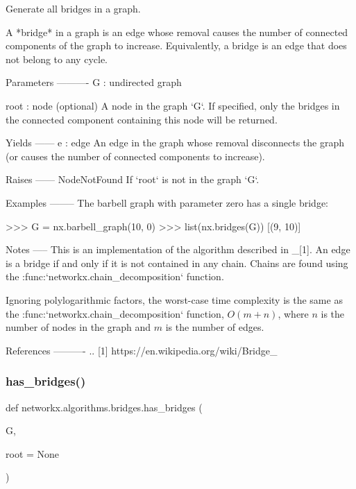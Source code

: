 \begin{DoxyVerb}Generate all bridges in a graph.

A *bridge* in a graph is an edge whose removal causes the number of
connected components of the graph to increase.  Equivalently, a bridge is an
edge that does not belong to any cycle.

Parameters
----------
G : undirected graph

root : node (optional)
   A node in the graph `G`. If specified, only the bridges in the
   connected component containing this node will be returned.

Yields
------
e : edge
   An edge in the graph whose removal disconnects the graph (or
   causes the number of connected components to increase).

Raises
------
NodeNotFound
   If `root` is not in the graph `G`.

Examples
--------
The barbell graph with parameter zero has a single bridge:

>>> G = nx.barbell_graph(10, 0)
>>> list(nx.bridges(G))
[(9, 10)]

Notes
-----
This is an implementation of the algorithm described in _[1].  An edge is a
bridge if and only if it is not contained in any chain. Chains are found
using the :func:`networkx.chain_decomposition` function.

Ignoring polylogarithmic factors, the worst-case time complexity is the
same as the :func:`networkx.chain_decomposition` function,
$O(m + n)$, where $n$ is the number of nodes in the graph and $m$ is
the number of edges.

References
----------
.. [1] https://en.wikipedia.org/wiki/Bridge_%
\end{DoxyVerb}
 \mbox{\label{namespacenetworkx_1_1algorithms_1_1bridges_aec6343d3c9fd6b7d3785154b980bcdda}} 
\subsubsection{\texorpdfstring{has\+\_\+bridges()}{has\_bridges()}}
{\footnotesize\ttfamily def networkx.\+algorithms.\+bridges.\+has\+\_\+bridges (\begin{DoxyParamCaption}\item[{}]{G,  }\item[{}]{root = {\ttfamily None} }\end{DoxyParamCaption})}

